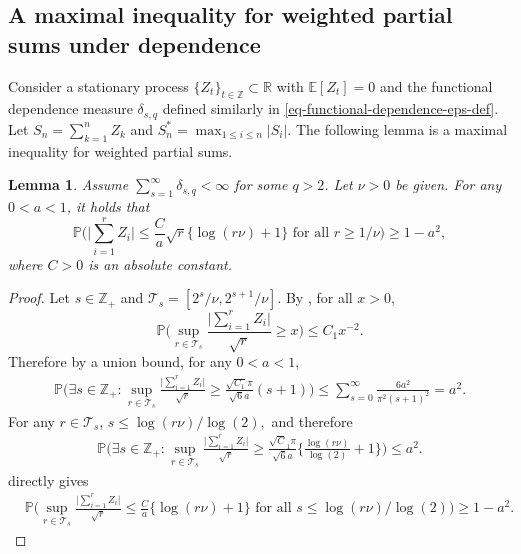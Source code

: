 \documentclass[11pt]{article}
\newcommand{\p}{\mathbb P}
\theoremstyle{plain}
\newtheorem{lemma}[theorem]{Lemma}
\theoremstyle{definition}
\begin{document}
\subsection{A maximal inequality for weighted partial sums under dependence}
Consider a stationary process $\{Z_t\}_{t \in \mathbb{Z}} \subset \mathbb{R}$ with $\mathbb{E}[Z_t] = 0$ and the functional dependence measure $\delta_{s,q}$ defined similarly in \eqref{eq-functional-dependence-eps-def}. Let $S_n = \sum_{k = 1}^nZ_k$ and $S^*_n = \max_{1 \leq i \leq n}|S_i|$. The following lemma is a   maximal inequality  for weighted partial sums.

\begin{lemma} \label{lemma:iterated log under dependence}
Assume $\sum_{s=1}^\infty   \delta _{s,q  } < \infty$ for some $q > 2$. Let  $\nu>0$ be given.  For any $ 0<a<1$,  it holds that
$$\p\bigg( \bigg| \sum_{i=1}^{ r  } Z _i  \bigg| \le  \frac{C }{  a } \sqrt r  \big \{   \log(  r\nu) +1   \big \}      \text{ for all } r\ge 1/\nu \bigg)  \ge 1- a^2 , $$
where $C > 0$ is an absolute constant.
\end{lemma}   
   \begin{proof}
   Let $ s\in \mathbb Z_+$ and $\mathcal T_s=[ 2^s /\nu, 2^{s+1}/\nu] $. By , for all $x>0 $, 
   $$ \p \bigg( \sup_{r \in  \mathcal T_s } \frac{ \big | \sum_{i=1}^r Z _i\big | }{ \sqrt {r }  } \ge  x    \bigg)  \le 
   C_1x^{-2}  . $$
   Therefore  by a  union bound,  for any $0<a<1$, 
  \begin{align} \label{eq:sub-gaussian dependence sup of random walk}
    \p \bigg(\exists s \in \mathbb Z_+ :   \sup_{r \in  \mathcal T_s } \frac{ \big| \sum_{i=1}^r Z _i \big| }{ \sqrt {r }} \ge    \frac{\sqrt {  C_1 }\pi }{\sqrt{6}a   }  ( s +1)  \bigg)    
  \le     \sum_{s=0}^\infty  \frac{6a^2 }{ \pi^2( s+1)^2 }  = a^2.
  \end{align}
   For any $r \in \mathcal{T}_s$, $s \le \log(r \nu)/\log(2), $ and therefore 
   \begin{align} \label{eq:sub-gaussian dependence sup of random walk 2}
    \p \bigg(\exists s \in \mathbb Z_+ :   \sup_{r \in  \mathcal T_s } \frac{ \big| \sum_{i=1}^r Z _i \big| }{ \sqrt {r }} \ge    \frac{\sqrt C_1 \pi}{\sqrt{6}a }   \bigg \{  \frac{\log(r\nu) }{ \log(2) } +1 \bigg \}   \bigg)    
  \le     a ^2 .
  \end{align} 
   directly gives 
   \begin{align*} 
  & \p \bigg(  \sup_{r \in  \mathcal T_s } \frac{ \big| \sum_{i=1}^r Z _i \big| }{ \sqrt {r }}   \le   \frac{C}{  a }  \big \{   \log(  r\nu) +1   \big \}   \text{ for all } s \le \log(r \nu)/\log(2)  \bigg)  
  \ge  1-    a ^2   .
  \end{align*}
   \end{proof} 
\end{document}
